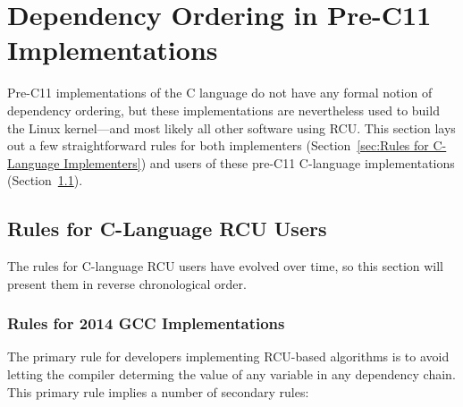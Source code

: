 \documentclass[letterpaper,twocolumn,10pt]{article}
\begin{document}
\section{Dependency Ordering in Pre-C11 Implementations}
\label{sec:Dependency Ordering in Pre-C11 Implementations}

Pre-C11 implementations of the C language do not have any formal
notion of dependency ordering, but these implementations are
nevertheless used to build the Linux kernel---and most likely
all other software using RCU.
This section lays out a few straightforward rules for both
implementers (Section~\ref{sec:Rules for C-Language Implementers})
and users of these pre-C11 C-language implementations
(Section~\ref{sec:Rules for C-Language RCU Users}).

\subsection{Rules for C-Language RCU Users}
\label{sec:Rules for C-Language RCU Users}

The rules for C-language RCU users have evolved over time, so this
section will present them in reverse chronological order.

\subsubsection{Rules for 2014 GCC Implementations}
\label{sec:Rules for 2014 GCC Implementations}

The primary rule for developers implementing RCU-based algorithms
is to avoid letting the compiler determing the value of any variable
in any dependency chain.
This primary rule implies a number of secondary rules:
\end{document}
